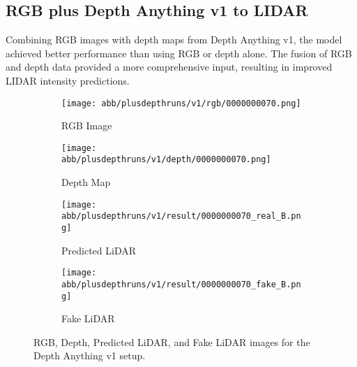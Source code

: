\subsection{RGB plus Depth Anything v1 to LIDAR}
Combining RGB images with depth maps from Depth Anything v1, the model achieved better performance than using RGB or depth alone. The fusion of RGB and depth data provided a more comprehensive input, resulting in improved LIDAR intensity predictions.
\begin{figure}[!ht]
	\centering
	\begin{subfigure}{0.4\textwidth}
		\centering
		\texttt{[image: abb/plusdepthruns/v1/rgb/0000000070.png]}
		\caption{RGB Image}
		\label{fig:v1_rgb}
	\end{subfigure}
	
	\vspace{1em} %
	
	\begin{subfigure}{0.4\textwidth}
		\centering
		\texttt{[image: abb/plusdepthruns/v1/depth/0000000070.png]}
		\caption{Depth Map}
		\label{fig:v1_depth}
	\end{subfigure}
	
	\vspace{1em} %
	
	\begin{subfigure}{0.25\textwidth}
		\centering
		\texttt{[image: abb/plusdepthruns/v1/result/0000000070\_real\_B.png]}
		\caption{Predicted LiDAR}
		\label{fig:v1_pred_lidar}
	\end{subfigure}
	\begin{subfigure}{0.25\textwidth}
		\centering
		\texttt{[image: abb/plusdepthruns/v1/result/0000000070\_fake\_B.png]}
		\caption{Fake LiDAR}
		\label{fig:v1_fake_lidar}
	\end{subfigure}
	
	\caption{RGB, Depth, Predicted LiDAR, and Fake LiDAR images for the Depth Anything v1 setup.}
	\label{fig:v1plusdepth}
\end{figure}

